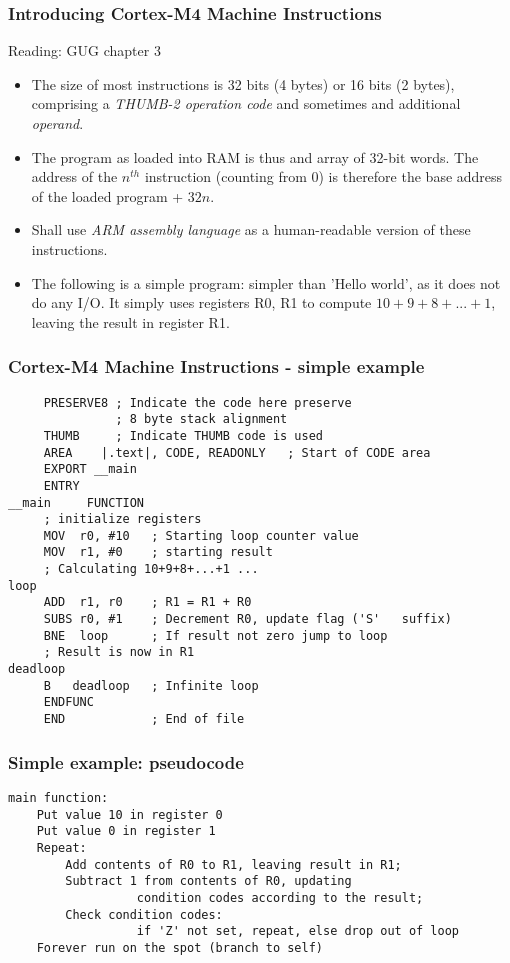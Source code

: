 \documentclass[10pt]{beamer}
\begin{document}
\begin{frame}
\frametitle{Introducing Cortex-M4 Machine Instructions}
Reading: GUG chapter 3
\begin{itemize}
\item The size of most instructions is 32 bits (4 bytes) or 16 bits (2 bytes), comprising a \emph{THUMB-2 operation code} and sometimes and additional \emph{operand}.
\item The program as loaded into RAM is thus and array of 32-bit words. The address of the $n^{th}$ instruction (counting from 0) is therefore the base address of the loaded program + $32n$.
\item Shall use \emph{ARM assembly language} as a human-readable version of these instructions.   
\item The following is a simple program: simpler than 'Hello world', as it does not do any I/O. It simply uses registers R0, R1 to compute $10+9+8+...+1$, leaving the result in register R1.
\end{itemize}
\end{frame}

\begin{frame} [fragile]
\frametitle{Cortex-M4 Machine Instructions - simple example}
\small {
\begin{verbatim}
     PRESERVE8 ; Indicate the code here preserve 
               ; 8 byte stack alignment
     THUMB     ; Indicate THUMB code is used
     AREA    |.text|, CODE, READONLY   ; Start of CODE area
     EXPORT __main
     ENTRY
__main     FUNCTION
     ; initialize registers
     MOV  r0, #10  	; Starting loop counter value
     MOV  r1, #0   	; starting result
     ; Calculating 10+9+8+...+1 ...
loop
     ADD  r1, r0   	; R1 = R1 + R0
     SUBS r0, #1   	; Decrement R0, update flag ('S'   suffix)
     BNE  loop    	; If result not zero jump to loop
     ; Result is now in R1
deadloop
     B   deadloop  	; Infinite loop
     ENDFUNC
     END            ; End of file
\end{verbatim}
}
\end{frame}

\begin{frame} [fragile]
\frametitle{Simple example: pseudocode}
\small {
\begin{verbatim}
main function:
    Put value 10 in register 0
    Put value 0 in register 1
    Repeat:
        Add contents of R0 to R1, leaving result in R1;
        Subtract 1 from contents of R0, updating
                  condition codes according to the result;
        Check condition codes:
                  if 'Z' not set, repeat, else drop out of loop
    Forever run on the spot (branch to self)
\end{verbatim}
}
\end{frame}
\end{document}
